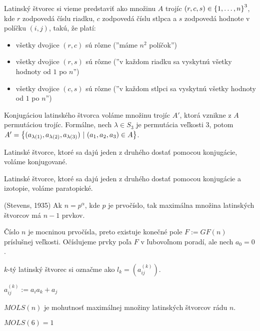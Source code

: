 \begin{definition}
Latinský štvorec si vieme predstaviť ako množinu $A$ trojíc $(r,c,s) \in \left\{1, \ldots, n\right\}^3$, 
kde $r$ zodpovedá číslu riadku, $c$ zodpovedá číslu stlpca a $s$ zodpovedá hodnote v políčku $(i, j)$, 
takú, že platí:
\begin{itemize}
    \item všetky dvojice $(r, c)$ sú rôzne (''máme $n^2$ políčok'')
    \item všetky dvojice $(r, s)$ sú rôzne (''v každom riadku sa vyskytnú všetky hodnoty od $1$ po $n$'')
    \item všetky dvojice $(c, s)$ sú rôzne (''v každom stlpci sa vyskytnú všetky hodnoty od $1$ po $n$'')
\end{itemize}  

Konjugáciou latinského štvorca voláme množinu trojíc $A'$, ktorá vznikne z $A$ permutáciou trojíc. Formálne,
nech $\lambda \in S_3$ je permutácia veľkosti $3$, potom $A' = \left\{ (a_{\lambda(1)}, a_{\lambda(2)}, a_{\lambda(3)} ) ~|~ (a_1, a_2, a_3) \in A\right\}$.

Latinské štvorce, ktoré sa dajú jeden z druhého dostať pomocou konjugácie, voláme konjugované.

Latinské štvorce, ktoré sa dajú jeden z druhého dostať pomocou konjugácie a izotopie, voláme paratopické.

\end{definition}


\begin{theorem}{(Stevens, 1935)}
Ak $n = p^\alpha$, kde $p$ je prvočíslo, tak maximálna množina latinských štvorcov má $n-1$ prvkov.
\end{theorem}

\begin{construction}
Číslo $n$ je mocninou prvočísla, preto existuje konečné pole $F := GF(n)$ príslušnej veľkosti. 
Očíslujeme prvky poľa $F$ v ľubovoľnom poradí, ale nech $a_0 = 0$.

$k$-tý latinský štvorec si označme ako $l_k = \left(a_{ij}^{(k)}\right)$.

$a_{ij}^{(k)} := a_i a_k + a_j$

\end{construction}

\begin{definition}
$MOLS(n)$ je mohutnosť maximálnej množiny latinských štvorcov rádu $n$.
\end{definition}

\begin{remark}
$MOLS(6) = 1$
\end{remark}

